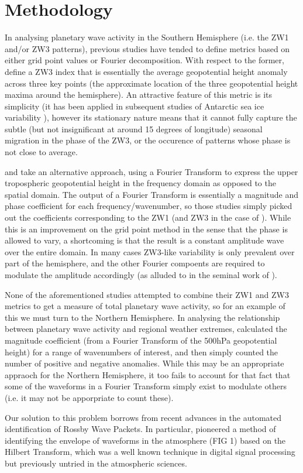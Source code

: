 \section{Methodology}

In analysing planetary wave activity in the Southern Hemisphere (i.e. the ZW1 and/or ZW3 patterns), previous studies have tended to define metrics based on either grid point values or Fourier decomposition. With respect to the former, \citet{Raphael2004} define a ZW3 index that is essentially the average geopotential height anomaly across three key points (the approximate location of the three geopotential height maxima around the hemisphere). An attractive feature of this metric is its simplicity (it has been applied in subsequent studies of Antarctic sea ice variability \citep{Raphael2007,Raphael2014}), however its stationary nature means that it cannot fully capture the subtle (but not insignificant at around 15 degrees of longitude) seasonal migration in the phase of the ZW3, or the occurence of patterns whose phase is not close to average.

\citet{Hobbs2007} and \citet{Hobbs2010} take an alternative approach, using a Fourier Transform to express the upper tropospheric geopotential height in the frequency domain as opposed to the spatial domain. The output of a Fourier Transform is essentially a magnitude and phase coefficient for each frequency/wavenumber, so those studies simply picked out the coefficients corresponding to the ZW1 (and ZW3 in the case of \citet{Hobbs2010}). While this is an improvement on the grid point method in the sense that the phase is allowed to vary, a shortcoming is that the result is a constant amplitude wave over the entire domain. In many cases ZW3-like variability is only prevalent over part of the hemisphere, and the other Fourier compoents are required to modulate the amplitude accordingly (as alluded to in the seminal work of \citet{vanLoon1972}).

None of the aforementioned studies attempted to combine their ZW1 and ZW3 metrics to get a measure of total planetary wave activity, so for an example of this we must turn to the Northern Hemisphere. In analysing the relationship between planetary wave activity and regional weather extremes, \citet{Screen2014} calculated the magnitude coefficient (from a Fourier Transform of the 500hPa geopotential height) for a range of wavenumbers of interest, and then simply counted the number of positive and negative anomalies. While this may be an appropriate appraoch for the Northern Hemisphere, it too fails to account for that fact that some of the waveforms in a Fourier Transform simply exist to modulate others (i.e. it may not be apporpriate to count these).  

Our solution to this problem borrows from recent advances in the automated identification of Rossby Wave Packets. In particular, \citet{Zimin2003} pioneered a method of identifying the envelope of waveforms in the atmosphere (FIG 1) based on the Hilbert Transform, which was a well known technique in digital signal processing but previously untried in the atmospheric sciences.

